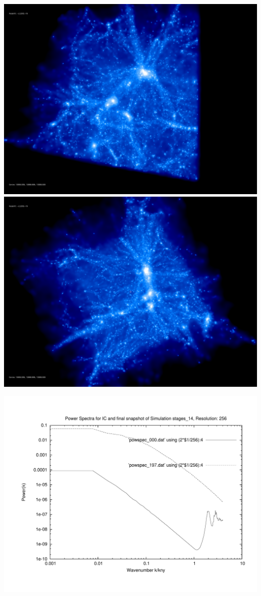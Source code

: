 \includegraphics[scale=0.1]{r256/h100/stages_14/rotate_00074.jpg} 
\includegraphics[scale=0.1]{r256/h100/stages_14/rotate_00131.jpg}

\includegraphics[scale=0.5]{r256/h100/stages_14/plot_powspec_stages_14}

